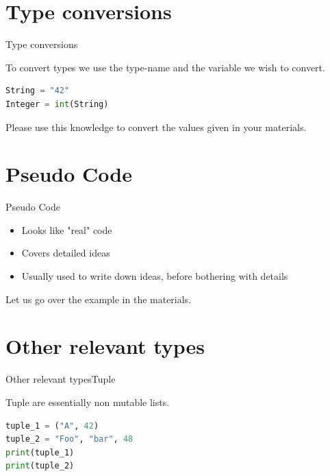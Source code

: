 \documentclass[aspectratio=169]{beamer}
\begin{document}
\section{Type conversions}
\begin{frame}[fragile]{Type conversions}

To convert types we use the type-name and the variable we wish to convert.

\begin{lstlisting}[language=Python, frame=single, basicstyle=\footnotesize]
String = "42"
Integer = int(String)
\end{lstlisting}

\vspace{2em}

Please use this knowledge to convert the values given in your materials.

\end{frame}

\section{Pseudo Code}
\begin{frame}{Pseudo Code}

\begin{itemize}
	\item Looks like "real" code
	\item Covers detailed ideas
	\item Usually used to write down ideas, before bothering with details
\end{itemize}

\pause

\vspace{2em}

Let us go over the example in the materials.

\end{frame}

\section{Other relevant types}
\begin{frame}[fragile]{Other relevant types}{Tuple}

Tuple are essentially non mutable lists.

\begin{lstlisting}[language=Python, frame=single]
tuple_1 = ("A", 42)
tuple_2 = "Foo", "bar", 48
print(tuple_1)
print(tuple_2)
\end{lstlisting}

\end{frame}
\end{document}
